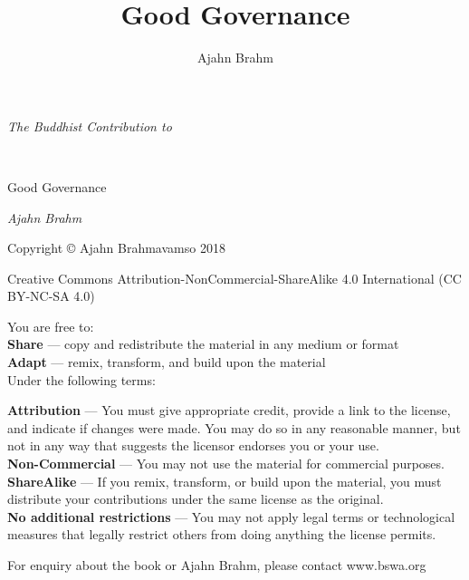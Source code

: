 ﻿\documentclass[11pt, openany]{book}
\title{Good Governance}
\author{Ajahn Brahm}
\date{}
\begin{document}
\frontmatter
\pagestyle{empty}
\newpage
\begin{center}\end{center}
\vspace{6em}
\begin{center}\begin{LARGE}\emph{The Buddhist Contribution to}\end{LARGE}\\
\vspace{1em}
\begin{Huge}\begin{sc}Good Governance\end{sc}\end{Huge}
\vspace{22em}

\begin{huge}\emph{Ajahn Brahm}\end{huge}


\end{center}



\newpage







\begin{small}{\sffamily

\noindent Copyright © Ajahn Brahmavamso 2018

\medskip

\noindent Creative Commons Attribution-NonCommercial-ShareAlike 4.0 International (CC BY-NC-SA 4.0)

\medskip

\noindent You are free to:\\
\textbf{Share} — copy and redistribute the material in any medium or format\\
\textbf{Adapt} — remix, transform, and build upon the material\\

\noindent Under the following terms:

\noindent \textbf{Attribution} — You must give appropriate credit, provide a link to the license, and indicate if changes were made. You may do so in any reasonable manner, but not in any way that suggests the licensor endorses you or your use.\\
\textbf{Non-Commercial} — You may not use the material for commercial purposes.\\
\textbf{ShareAlike} — If you remix, transform, or build upon the material, you must distribute your contributions under the same license as the original.\\
\textbf{No additional restrictions} — You may not apply legal terms or technological measures that legally restrict others from doing anything the license permits.


\vspace{4em}

\noindent For enquiry about the book or Ajahn Brahm, please contact www.bswa.org

}


\end{small}
\mainmatter
\pagestyle{fancy}
\end{document}
